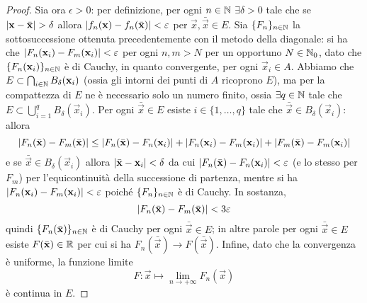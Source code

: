 \begin{proof}
    Sia ora $\epsilon>0$: per definizione, per ogni $n\in\mathbb{N}$ $\exists\delta>0$ tale che se $\lvert\mathbf{x}-\bar{\mathbf{x}}\rvert>\delta$ allora $\lvert f_n(\mathbf{x})-f_n(\bar{\mathbf{x}})\rvert<\varepsilon$ per $\vec x,\bar{\vec x}\in E$.
    Sia $\{F_n\}_{n\in\mathbb{N}}$ la sottosuccessione ottenuta precedentemente con il metodo della diagonale: si ha che $\lvert F_n(\mathbf{x}_i)-F_m(\mathbf{x}_i)\rvert<\varepsilon$ per ogni $n,m>N$ per un opportuno $N\in\mathbb{N}_0$, dato che $\{F_n(\mathbf{x}_i)\}_{n\in\mathbb{N}}$ è di Cauchy, in quanto convergente, per ogni $\vec x_i\in A$.
    Abbiamo che $E\subset\bigcap_{i\in\mathbb{N}} B_{\delta}(\mathbf{x}_i)$ (ossia gli intorni dei punti di $A$ ricoprono $E$), ma per la compattezza di $E$ ne è necessario solo un numero finito, ossia $\exists q\in\mathbb{N}$ tale che $E\subset\bigcup_{i=1}^q B_\delta(\vec x_i)$.
    Per ogni $\bar{\vec x}\in E$ esiste $i\in\{1,\dotsc,q\}$ tale che $\bar{\vec x}\in B_\delta(\vec x_i)$: allora
    \begin{equation}
        \lvert F_n(\bar{\mathbf{x}})-F_m(\bar{\mathbf{x}})\rvert\le
        \lvert F_n(\bar{\mathbf{x}})-F_n(\mathbf{x}_i)\rvert+\lvert F_n(\mathbf{x}_i)-F_m(\mathbf{x}_i)\rvert+\lvert F_m(\bar{\mathbf{x}})-F_m(\mathbf{x}_i)\rvert
    \end{equation}
    e se $\bar{\vec x}\in B_\delta(\vec x_i)$ allora $\lvert\bar{\mathbf{x}}-\mathbf{x}_i\rvert<\delta$ da cui $\lvert F_n(\bar{\mathbf{x}})-F_n(\mathbf{x}_i)\rvert<\varepsilon$ (e lo stesso per $F_m$) per l'equicontinuità della successione di partenza, mentre si ha $\lvert F_n(\mathbf{x}_i)-F_m(\mathbf{x}_i)\rvert<\varepsilon$ poich\'e $\{F_n\}_{n\in\mathbb{N}}$ è di Cauchy.
    In sostanza,
    \begin{equation}
        \lvert F_n(\bar{\mathbf{x}})-F_m(\bar{\mathbf{x}})\rvert<3\varepsilon
    \end{equation}
    quindi $\{F_n(\bar{\mathbf{x}})\}_{n\in\mathbb{N}}$ è di Cauchy per ogni $\bar{\vec x}\in E$; in altre parole per ogni $\bar{\vec x}\in E$ esiste $F(\bar{\mathbf{x}})\in\mathbb{R}$ per cui si ha $F_n(\bar{\vec x})\to F(\bar{\vec x})$.
    Infine, dato che la convergenza è uniforme, la funzione limite
    \begin{equation}
        F\colon\vec x\mapsto\lim_{n\to+\infty}F_n(\vec x)
    \end{equation}
    è continua in $E$.
\end{proof}

